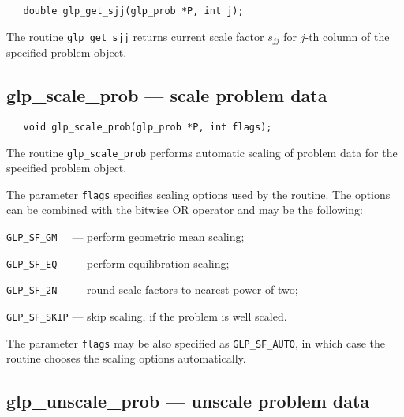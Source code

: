 \vspace*{-4pt}

\synopsis

\begin{verbatim}
   double glp_get_sjj(glp_prob *P, int j);
\end{verbatim}

\returns

The routine \verb|glp_get_sjj| returns current scale factor $s_{jj}$
for $j$-th column of the specified problem object.

\vspace*{-6pt}

\subsection{glp\_scale\_prob --- scale problem data}

\vspace*{-4pt}

\synopsis

\begin{verbatim}
   void glp_scale_prob(glp_prob *P, int flags);
\end{verbatim}

\description

The routine \verb|glp_scale_prob| performs automatic scaling of problem
data for the specified problem object.

The parameter \verb|flags| specifies scaling options used by the
routine. The options can be combined with the bitwise OR operator and
may be the following:

\verb|GLP_SF_GM  | --- perform geometric mean scaling;

\verb|GLP_SF_EQ  | --- perform equilibration scaling;

\verb|GLP_SF_2N  | --- round scale factors to nearest power of two;

\verb|GLP_SF_SKIP| --- skip scaling, if the problem is well scaled.

The parameter \verb|flags| may be also specified as \verb|GLP_SF_AUTO|,
in which case the routine chooses the scaling options automatically.

\vspace*{-6pt}

\subsection{glp\_unscale\_prob --- unscale problem data}

